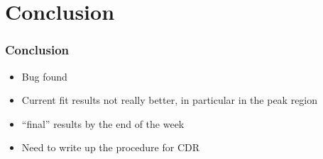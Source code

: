 \documentclass{beamer}
\begin{document}
\section{Conclusion}
\begin{frame}
\frametitle{Conclusion}
\begin{itemize}
  \item Bug found
  \item Current fit results not really better, in particular in the peak region
  \item ``final'' results by the end of the week
  \item Need to write up the procedure for CDR
\end{itemize}
\end{frame}
\end{document}
